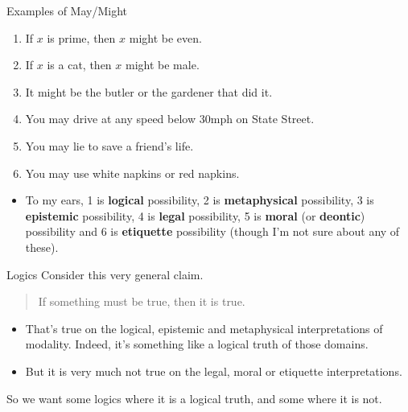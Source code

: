 \documentclass[
  14pt,
  letterpaper,
  ignorenonframetext,
  aspectratio=169,
  handout]{beamer}
\providecommand{\tightlist}{%
  \setlength{\itemsep}{0pt}\setlength{\parskip}{0pt}}\usepackage{longtable,booktabs,array}
\begin{document}
\begin{frame}{Examples of May/Might}
\protect\hypertarget{examples-of-maymight}{}
\begin{enumerate}[<+->]
\tightlist
\item
  If \(x\) is prime, then \(x\) might be even.
\item
  If \(x\) is a cat, then \(x\) might be male.
\item
  It might be the butler or the gardener that did it.
\item
  You may drive at any speed below 30mph on State Street.
\item
  You may lie to save a friend's life.
\item
  You may use white napkins or red napkins.
\end{enumerate}

\begin{itemize}[<+->]
\tightlist
\item
  To my ears, 1 is \textbf{logical} possibility, 2 is
  \textbf{metaphysical} possibility, 3 is \textbf{epistemic}
  possibility, 4 is \textbf{legal} possibility, 5 is \textbf{moral} (or
  \textbf{deontic}) possibility and 6 is \textbf{etiquette} possibility
  (though I'm not sure about any of these).
\end{itemize}
\end{frame}

\begin{frame}{Logics}
\protect\hypertarget{logics}{}
Consider this very general claim.

\begin{quote}
If something must be true, then it is true.
\end{quote}

\begin{itemize}[<+->]
\tightlist
\item
  That's true on the logical, epistemic and metaphysical interpretations
  of modality. \pause Indeed, it's something like a logical truth of
  those domains.
\item
  But it is very much not true on the legal, moral or etiquette
  interpretations.
\end{itemize}

So we want some logics where it is a logical truth, and some where it is
not.
\end{frame}
\end{document}
